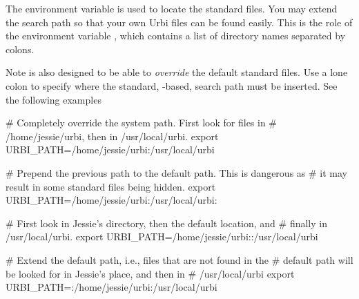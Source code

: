 The environment variable  is used to locate the \us
standard files.  You may extend the search path so that your own Urbi
files can be found easily.  This is the role of the environment
variable ,
which contains a list of directory
names separated by colons.

Note  is also designed to be able to \emph{override}
the default standard files.  Use a lone colon to specify where the
standard, -based, search path must be inserted.  See
the following examples

\begin{shell}
# Completely override the system path.  First look for files in
# /home/jessie/urbi, then in /usr/local/urbi.
export URBI_PATH=/home/jessie/urbi:/usr/local/urbi

# Prepend the previous path to the default path.  This is dangerous as
# it may result in some standard files being hidden.
export URBI_PATH=/home/jessie/urbi:/usr/local/urbi:

# First look in Jessie's directory, then the default location, and
# finally in /usr/local/urbi.
export URBI_PATH=/home/jessie/urbi::/usr/local/urbi

# Extend the default path, i.e., files that are not found in the
# default path will be looked for in Jessie's place, and then in
# /usr/local/urbi
export URBI_PATH=:/home/jessie/urbi:/usr/local/urbi
\end{shell}


